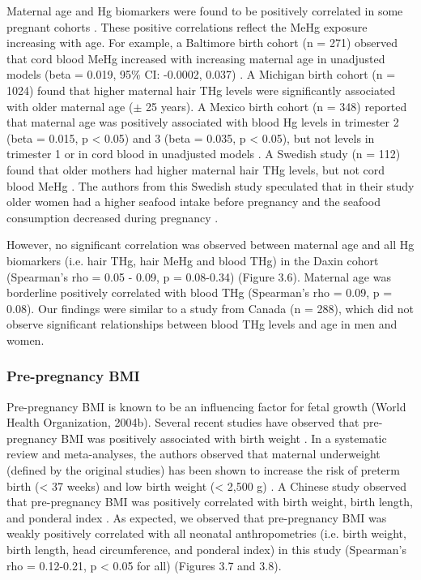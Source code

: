 Maternal age and Hg biomarkers were found to be positively correlated in some pregnant cohorts \cite{basu2014mercury,bjornberg2003methyl,wells2016cord,xue2007maternal}. These positive correlations reflect the MeHg exposure increasing with age. For example, a Baltimore birth cohort (n = 271) observed that cord blood MeHg increased with increasing maternal age in unadjusted models (beta = 0.019, 95\% CI: -0.0002, 0.037) \citep{wells2016cord}. A Michigan birth cohort (n = 1024) found that higher maternal hair THg levels were significantly associated with older maternal age (${\pm}$ 25 years)\citep{xue2007maternal}. A Mexico birth cohort (n = 348) reported that maternal age was positively associated with blood Hg levels in trimester 2 (beta = 0.015, p < 0.05) and 3 (beta = 0.035, p < 0.05), but not levels in trimester 1 or in cord blood in unadjusted models \citep{basu2014mercury}. A Swedish study (n = 112) found that older mothers had higher maternal hair THg levels, but not cord blood MeHg \citep{bjornberg2003methyl}. The authors from this Swedish study speculated that in their study older women had a higher seafood intake before pregnancy and the seafood consumption decreased during pregnancy \citep{bjornberg2003methyl}.

However, no significant correlation was observed between maternal age and all Hg biomarkers (i.e. hair THg, hair MeHg and blood THg) in the Daxin cohort (Spearman's rho = 0.05 - 0.09, p = 0.08-0.34) (Figure 3.6). Maternal age was borderline positively correlated with blood THg (Spearman's rho = 0.09, p = 0.08). Our findings were similar to a study from Canada \citep{mahaffey1998blood} (n = 288), which did not observe significant relationships between blood THg levels and age in men and women.

\subsubsection{Pre-pregnancy BMI}

Pre-pregnancy BMI is known to be an influencing factor for fetal growth (World Health Organization, 2004b). Several recent studies have observed that pre-pregnancy BMI was positively associated with birth weight \citep{pfrederick2008pre,nohr2008combined}. In a systematic review and meta-analyses, the authors observed that maternal underweight (defined by the original studies) has been shown to increase the risk of preterm birth (< 37 weeks) and low birth weight (< 2,500 g) \citep{han2012maternal}. A Chinese study observed that pre-pregnancy BMI was positively correlated with birth weight, birth length, and ponderal index \citep{yu2013elevated}. As expected, we observed that pre-pregnancy BMI was weakly positively correlated with all neonatal anthropometries (i.e. birth weight, birth length, head circumference, and ponderal index) in this study (Spearman's rho = 0.12-0.21, p < 0.05 for all) (Figures 3.7 and 3.8). 

